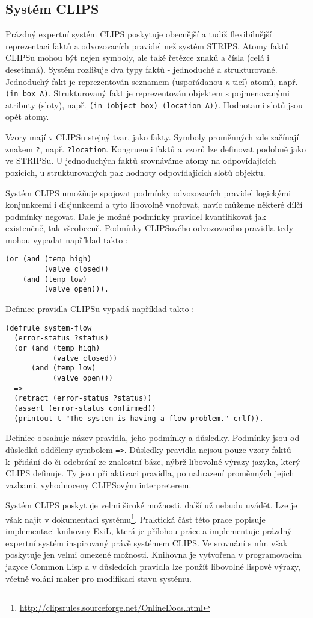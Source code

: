 \subsection{Systém CLIPS}

Prázdný expertní systém CLIPS poskytuje obecnější a tudíž flexibilnější
reprezentaci faktů a odvozovacích pravidel než systém STRIPS. Atomy faktů CLIPSu
mohou být nejen symboly, ale také řetězce znaků a čísla (celá i desetinná).
Systém rozlišuje dva typy faktů - jednoduché a strukturované. Jednoduchý fakt je
reprezentován seznamem (uspořádanou \emph{n}-ticí) atomů, např.
\verb|(in box A)|. Strukturovaný fakt je reprezentován objektem s pojmenovanými
atributy (sloty), např. \verb|(in (object box) (location A))|. Hodnotami slotů jsou
opět atomy.

Vzory mají v CLIPSu stejný tvar, jako fakty. Symboly proměnných zde začínají
znakem \verb|?|, např. \verb|?location|. Kongruenci faktů a vzorů lze definovat
podobně jako ve STRIPSu. U jednoduchých faktů srovnáváme atomy na odpovídajících
pozicích, u strukturovaných pak hodnoty odpovídajících slotů objektu.

Systém CLIPS umožňuje spojovat podmínky odvozovacích pravidel logickými
konjunkcemi i disjunkcemi a tyto libovolně vnořovat, navíc můžeme některé dílčí
podmínky negovat. Dale je možné podmínky pravidel kvantifikovat jak existenčně,
tak všeobecně. Podmínky CLIPSového odvozovacího pravidla tedy mohou vypadat
například takto \cite{clips}:
\begin{verbatim}
(or (and (temp high)
         (valve closed))
    (and (temp low)
         (valve open))).
\end{verbatim}

Definice pravidla CLIPSu vypadá například takto \cite{clips}:
\begin{verbatim}
(defrule system-flow
  (error-status ?status)
  (or (and (temp high)
           (valve closed))
      (and (temp low)
           (valve open)))
  =>
  (retract (error-status ?status))
  (assert (error-status confirmed))
  (printout t "The system is having a flow problem." crlf)).
\end{verbatim}
Definice obsahuje název pravidla, jeho podmínky a důsledky. Podmínky jsou od
důsledků odděleny symbolem \verb|=>|. Důsledky pravidla nejsou pouze vzory faktů
k~přidání do či odebrání ze znalostní báze, nýbrž libovolné výrazy jazyka, který
CLIPS definuje. Ty jsou při aktivaci pravidla, po nahrazení proměnných jejich
vazbami, vyhodnoceny CLIPSovým interpreterem.

Systém CLIPS poskytuje velmi široké možnosti, další už nebudu uvádět. Lze je
však najít v dokumentaci
systému\footnote{\url{http://clipsrules.sourceforge.net/OnlineDocs.html}}.
Praktická část této prace popisuje implementaci knihovny ExiL, která je přílohou
práce a implementuje prázdný expertní systém inspirovaný právě systémem CLIPS.
Ve srovnání s ním však poskytuje jen velmi omezené možnosti. Knihovna je
vytvořena v programovacím jazyce Common Lisp a v důsledcích pravidla lze použít
libovolné lispové výrazy, včetně volání maker pro modifikaci stavu systému.
